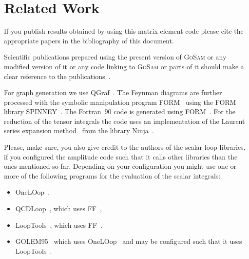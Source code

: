 \documentclass[a4paper]{article}
\begin{document}


\printindex

\section{Related Work}
If you publish results obtained by using this matrix element code
please cite the appropriate papers in the bibliography of this document.

Scientific publications prepared using the present version of
\textsc{GoSam} or any modified version of it or any code linking to
\textsc{GoSam} or parts of it should make a clear
reference to the publications~\cite{Cullen:2014yla,Cullen:2011ac}.

For graph generation we use QGraf~\cite{Nogueira:1991ex}.
The Feynman diagrams are further processed with the symbolic manipulation
program FORM~\cite{Kuipers:2012rf,Vermaseren:2000nd} using the FORM library
SPINNEY~\cite{Cullen:2010jv}.
The Fortran~90 code is generated using
FORM~\cite{Kuipers:2012rf,Vermaseren:2000nd}.
For the reduction of the tensor integrals
the code uses an implementation of the Laurent series expansion
method~\cite{Mastrolia:2012bu}
from the library Ninja~\cite{Peraro:2014cba}.


Please, make sure, you also give credit to the authors of the scalar
loop libraries, if you configured the amplitude code such that it calls
other libraries than the ones mentioned so far. Depending on your
configuration you might use one or more of the following programs for
the evaluation of the scalar integrals:
\begin{itemize}
\item OneLOop~\cite{vanHameren:2010cp},
\item QCDLoop~\cite{Ellis:2007qk}, which uses FF~\cite{vanOldenborgh:1990yc},
\item LoopTools~\cite{Hahn:1998yk}, which uses FF~\cite{vanOldenborgh:1990yc}.
\item GOLEM95~\cite{Binoth:2008uq,Guillet:2013msa} which uses OneLOop~\cite{vanHameren:2010cp}
   and may be configured such that it uses
   LoopTools~\cite{Hahn:1998yk,vanOldenborgh:1990yc}.
\end{itemize}
\end{document}
